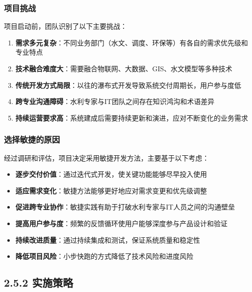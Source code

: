 \subsubsection{项目挑战}\label{ux9879ux76eeux6311ux6218}

项目启动前，团队识别了以下主要挑战：

\begin{enumerate}
\def\labelenumi{\arabic{enumi}.}
\tightlist
\item
  \textbf{需求多元复杂}：不同业务部门（水文、调度、环保等）有各自的需求优先级和专业特点
\item
  \textbf{技术融合难度大}：需要融合物联网、大数据、GIS、水文模型等多种技术
\item
  \textbf{传统开发方式局限}：以往的瀑布式开发导致系统交付周期长，用户参与度低
\item
  \textbf{跨专业沟通障碍}：水利专家与IT团队之间存在知识鸿沟和术语差异
\item
  \textbf{持续运营要求高}：系统建成后需要持续更新和演进，应对不断变化的业务需求
\end{enumerate}

\subsubsection{选择敏捷的原因}\label{ux9009ux62e9ux654fux6377ux7684ux539fux56e0}

经过调研和评估，项目决定采用敏捷开发方法，主要基于以下考虑：

\begin{itemize}
\tightlist
\item
  \textbf{逐步交付价值}：通过迭代式开发，使关键功能能够尽早投入使用
\item
  \textbf{适应需求变化}：敏捷方法能够更好地应对需求变更和优先级调整
\item
  \textbf{促进跨专业协作}：敏捷实践有助于打破水利专家与IT人员之间的沟通壁垒
\item
  \textbf{提高用户参与度}：频繁的反馈循环使用户能够深度参与产品设计和验证
\item
  \textbf{持续改进质量}：通过持续集成和测试，保证系统质量和稳定性
\item
  \textbf{降低项目风险}：小步快跑的方式降低了技术风险和进度风险
\end{itemize}

\subsection{2.5.2 实施策略}\label{ux5b9eux65bdux7b56ux7565}

